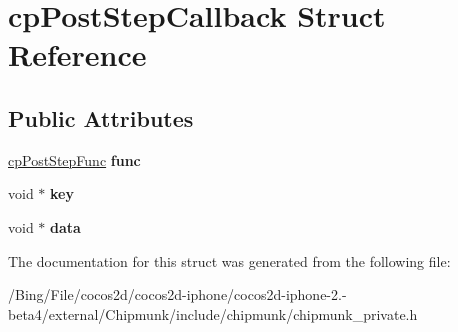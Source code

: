 \hypertarget{structcp_post_step_callback}{\section{cp\-Post\-Step\-Callback Struct Reference}
\label{structcp_post_step_callback}
}
\subsection*{Public Attributes}
\begin{DoxyCompactItemize}
\item 
\hypertarget{structcp_post_step_callback_a0733e08f69a9b0c993ca16b31ce2d2b8}{\hyperlink{group__cp_space_ga54254190b156e3b786c3f256fcc12348}{cp\-Post\-Step\-Func} {\bfseries func}}\label{structcp_post_step_callback_a0733e08f69a9b0c993ca16b31ce2d2b8}

\item 
\hypertarget{structcp_post_step_callback_aab8cd0fa6eb37c3df6e946075abe9cc1}{void $\ast$ {\bfseries key}}\label{structcp_post_step_callback_aab8cd0fa6eb37c3df6e946075abe9cc1}

\item 
\hypertarget{structcp_post_step_callback_aa781c6dea369d312674f5dc78d090017}{void $\ast$ {\bfseries data}}\label{structcp_post_step_callback_aa781c6dea369d312674f5dc78d090017}

\end{DoxyCompactItemize}


The documentation for this struct was generated from the following file\-:\begin{DoxyCompactItemize}
\item 
/\-Bing/\-File/cocos2d/cocos2d-\/iphone/cocos2d-\/iphone-\/2.-\/beta4/external/\-Chipmunk/include/chipmunk/chipmunk\-\_\-private.\-h\end{DoxyCompactItemize}
